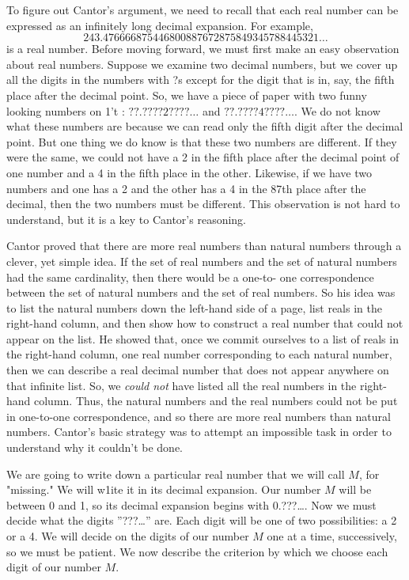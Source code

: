 To figure out Cantor's argument, we need to recall that each real number can be expressed as an infinitely long decimal expansion. For example,
\[ 243.4 76666875446800887672875849345788445321 \dots\]
is a real number. Before moving forward, we must first make an easy observation about real numbers. Suppose we examine two decimal numbers, but we cover up all the digits in the numbers with ?s except for the digit that is in, say, the fifth place after the decimal point. So, we have a piece of paper with two funny looking numbers on 1't : $??.????2????\dots$ and $??.????4????\dots$. We do not know what these numbers are because we can read only the fifth digit after the decimal point. But one thing we do know is that these two numbers are different. If they were the same, we could not have a 2 in the fifth place after the decimal point of one number and a 4 in the fifth place in the other. Likewise, if we have two numbers and one has a 2 and the other has a 4 in the 87th place after the decimal, then the two numbers must be different. This observation is not hard to understand, but it is a key to Cantor's reasoning.  

Cantor proved that there are more real numbers than natural numbers through a clever, yet simple idea. If the set of real numbers and the set of natural numbers had the same cardinality, then there would be a one-to- one correspondence between the set of natural numbers and the set of real numbers. So his idea was to list the natural numbers down the left-hand side of a page, list reals in the right-hand column, and then show how to construct a real number that could not appear on the list. He showed that, once we commit ourselves to a list of reals in the right-hand column, one real number corresponding to each natural number, then we can describe a real decimal number that does not appear anywhere on that infinite list. So, we \emph{could not} have listed all the real numbers in the right-hand column. Thus, the natural numbers and the real numbers could not be put in one-to-one correspondence, and so there are more real numbers than natural numbers. Cantor's basic strategy was to attempt an impossible task in order to understand why it couldn't be done. 

We are going to write down a particular real number that we will call $M$, for "missing." We will w1ite it in its decimal expansion. Our number $M$ will be between 0 and 1, so its decimal expansion begins with 0.???\dots. Now we must decide what the digits ''???\dots'' are. Each digit will be one of two possibilities: a 2 or a 4. We will decide on the digits of our number $M$ one at a time, successively, so we must be patient. We now describe the criterion by which we choose each digit of our number $M$.

